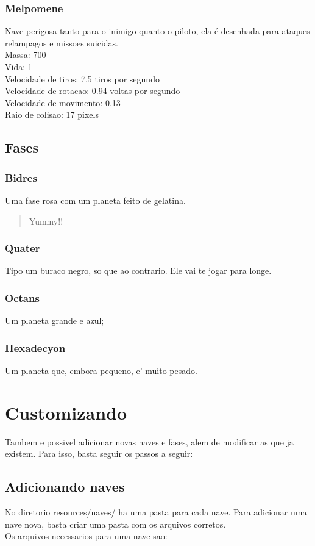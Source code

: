 \documentclass[a4paper]{book}
\begin{document}
\subsection {Melpomene}
Nave perigosa tanto para o inimigo quanto o piloto, ela é desenhada para ataques relampagos e missoes suicidas.
\\Massa: 700
\\Vida: 1
\\Velocidade de tiros: 7.5 tiros por segundo
\\Velocidade de rotacao: 0.94 voltas por segundo
\\Velocidade de movimento: 0.13
\\Raio de colisao: 17 pixels

\section {Fases}

\subsection {Bidres}
Uma fase rosa com um planeta feito de gelatina.

\begin {quote}
    Yummy!!
\end {quote}

\subsection {Quater}
Tipo um buraco negro, so que ao contrario. Ele vai te jogar para longe.

\subsection {Octans}
Um planeta grande e azul;

\subsection {Hexadecyon}
Um planeta que, embora pequeno, e' muito pesado.

\chapter {Customizando}
Tambem e possivel adicionar novas naves e fases, alem de modificar as que ja existem. Para isso, basta seguir os passos a seguir:

\section {Adicionando naves}
No diretorio resources/naves/ ha uma pasta para cada nave. Para adicionar uma nave nova, basta criar uma pasta com os arquivos corretos.
\\Os arquivos necessarios para uma nave sao:
\end{document}
